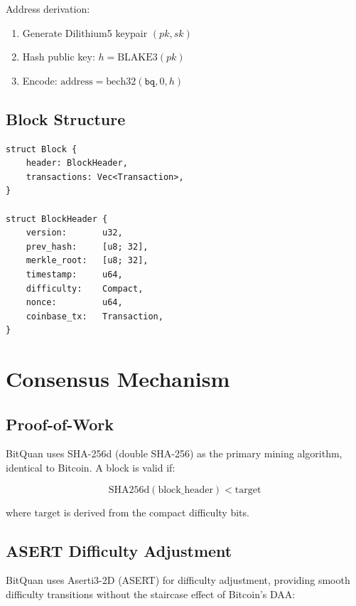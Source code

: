 \documentclass[11pt,a4paper]{article}
\begin{document}
Address derivation:
\begin{enumerate}
    \item Generate Dilithium5 keypair $(pk, sk)$
    \item Hash public key: $h = \text{BLAKE3}(pk)$
    \item Encode: $\text{address} = \text{bech32}(\texttt{bq}, 0, h)$
\end{enumerate}

\subsection{Block Structure}

\begin{lstlisting}[caption={Block structure (simplified)}]
struct Block {
    header: BlockHeader,
    transactions: Vec<Transaction>,
}

struct BlockHeader {
    version:       u32,
    prev_hash:     [u8; 32],
    merkle_root:   [u8; 32],
    timestamp:     u64,
    difficulty:    Compact,
    nonce:         u64,
    coinbase_tx:   Transaction,
}
\end{lstlisting}

\section{Consensus Mechanism}

\subsection{Proof-of-Work}

BitQuan uses SHA-256d (double SHA-256) as the primary mining algorithm, identical to Bitcoin. A block is valid if:

\begin{equation}
    \text{SHA256d}(\text{block\_header}) < \text{target}
\end{equation}

where $\text{target}$ is derived from the compact difficulty bits.

\subsection{ASERT Difficulty Adjustment}

BitQuan uses Aserti3-2D (ASERT) for difficulty adjustment, providing smooth difficulty transitions without the staircase effect of Bitcoin's DAA:
\end{document}
